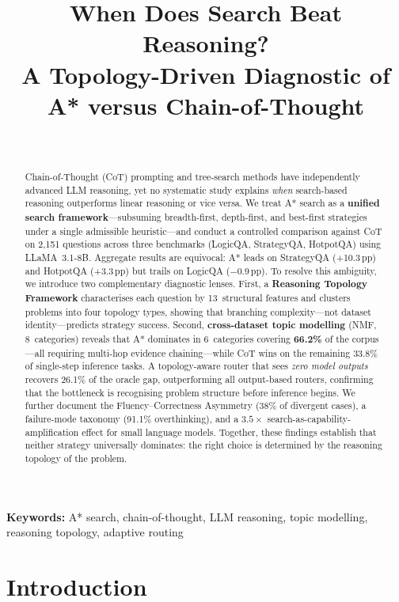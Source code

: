 \documentclass{article}
\title{When Does Search Beat Reasoning?\\
A Topology-Driven Diagnostic of A* versus Chain-of-Thought}
\author{%
  \name [Author Names] \email [email@institution.edu] \\
  \addr [Department, Institution, City, Country]
}
\newcommand{\pp}{\,pp\xspace}
\begin{document}
\maketitle

\begin{abstract}
Chain-of-Thought (CoT) prompting and tree-search methods have independently
advanced LLM reasoning, yet no systematic study explains \emph{when}
search-based reasoning outperforms linear reasoning or vice versa.  We treat
A* search as a \textbf{unified search framework}---subsuming breadth-first,
depth-first, and best-first strategies under a single admissible
heuristic---and conduct a controlled comparison against CoT on 2,151 questions
across three benchmarks (LogicQA, StrategyQA, HotpotQA) using LLaMA~3.1-8B.
Aggregate results are equivocal: A* leads on StrategyQA (+10.3\pp) and
HotpotQA (+3.3\pp) but trails on LogicQA ($-$0.9\pp).  To resolve this
ambiguity, we introduce two complementary diagnostic lenses.  First, a
\textbf{Reasoning Topology Framework} characterises each question by
13~structural features and clusters problems into four topology types, showing
that branching complexity---not dataset identity---predicts strategy success.
Second, \textbf{cross-dataset topic modelling} (NMF, 8~categories) reveals
that A* dominates in 6~categories covering \textbf{66.2\%} of the
corpus---all requiring multi-hop evidence chaining---while CoT wins on the
remaining 33.8\% of single-step inference tasks.  A topology-aware router
that sees \emph{zero model outputs} recovers 26.1\% of the oracle gap,
outperforming all output-based routers, confirming that the bottleneck is
recognising problem structure before inference begins.  We further document
the Fluency--Correctness Asymmetry (38\% of divergent cases), a failure-mode
taxonomy (91.1\% overthinking), and a $3.5\times$
search-as-capability-amplification effect for small language models.
Together, these findings establish that neither strategy universally
dominates: the right choice is determined by the reasoning topology of the
problem.
\end{abstract}

\textbf{Keywords:} A* search, chain-of-thought, LLM reasoning, topic
modelling, reasoning topology, adaptive routing

\section{Introduction}
\label{sec:intro}
\end{document}
